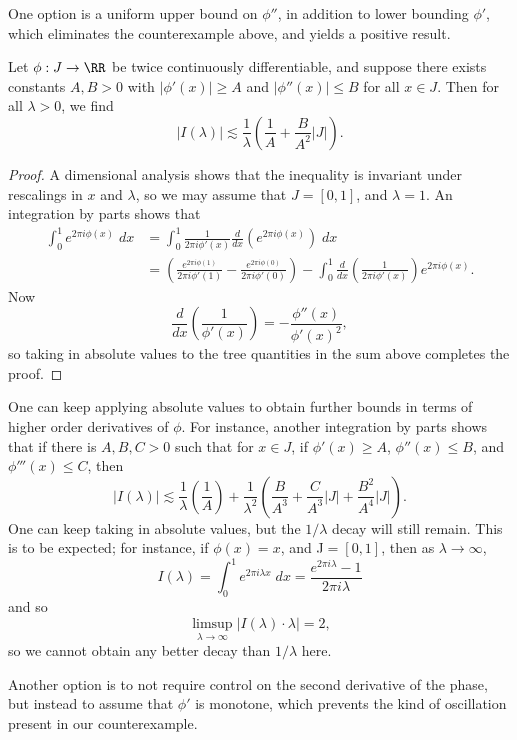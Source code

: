 One option is a uniform upper bound on $\phi''$, in addition to lower bounding $\phi'$, which eliminates the counterexample above, and yields a positive result.

\begin{theorem}
  Let $\phi: J \to \RR$ be twice continuously differentiable, and suppose there exists constants $A,B > 0$ with $|\phi'(x)| \geq A$ and $|\phi''(x)| \leq B$ for all $x \in J$. Then for all $\lambda > 0$, we find
  \[ |I(\lambda)| \lesssim \frac{1}{\lambda} \left( \frac{1}{A} + \frac{B}{A^2} |J| \right). \]
\end{theorem}
\begin{proof}
  A dimensional analysis shows that the inequality is invariant under rescalings in $x$ and $\lambda$, so we may assume that $J = [0,1]$, and $\lambda = 1$. An integration by parts shows that
  \begin{align*}
    \int_0^1 e^{2 \pi i \phi(x)}\; dx &= \int_0^1 \frac{1}{2 \pi i \phi'(x)} \frac{d}{dx} \left( e^{2 \pi i \phi(x)} \right)\; dx\\
    &= \left( \frac{e^{2 \pi i \phi(1)}}{2 \pi i \phi'(1)} - \frac{e^{2 \pi i \phi(0)}}{2 \pi i \phi'(0)} \right) - \int_0^1 \frac{d}{dx} \left( \frac{1}{2 \pi i \phi'(x)} \right) e^{2 \pi i \phi(x)}.
  \end{align*}
  Now
  \[ \frac{d}{dx} \left( \frac{1}{\phi'(x)} \right) = - \frac{\phi''(x)}{\phi'(x)^2}, \]
  so taking in absolute values to the tree quantities in the sum above completes the proof.
\end{proof}

One can keep applying absolute values to obtain further bounds in terms of higher order derivatives of $\phi$. For instance, another integration by parts shows that if there is $A,B,C > 0$ such that for $x \in J$, if $\phi'(x) \geq A$, $\phi''(x) \leq B$, and $\phi'''(x) \leq C$, then
%
\[ |I(\lambda)| \lesssim \frac{1}{\lambda} \left( \frac{1}{A} \right) + \frac{1}{\lambda^2} \left( \frac{B}{A^3} + \frac{C}{A^3} |J| + \frac{B^2}{A^4} |J| \right). \]
%
One can keep taking in absolute values, but the $1/\lambda$ decay will still remain. This is to be expected; for instance, if $\phi(x) = x$, and J$ = [0,1]$, then as $\lambda \to \infty$,
%
\[ I(\lambda) = \int_0^1 e^{2 \pi i \lambda x}\; dx = \frac{e^{2 \pi i \lambda} - 1}{2 \pi i \lambda} \]
%
and so
%
\[ \limsup_{\lambda \to \infty} |I(\lambda) \cdot \lambda| = 2, \]
%
so we cannot obtain any better decay than $1/\lambda$ here.

Another option is to not require control on the second derivative of the phase, but instead to assume that $\phi'$ is monotone, which prevents the kind of oscillation present in our counterexample.

